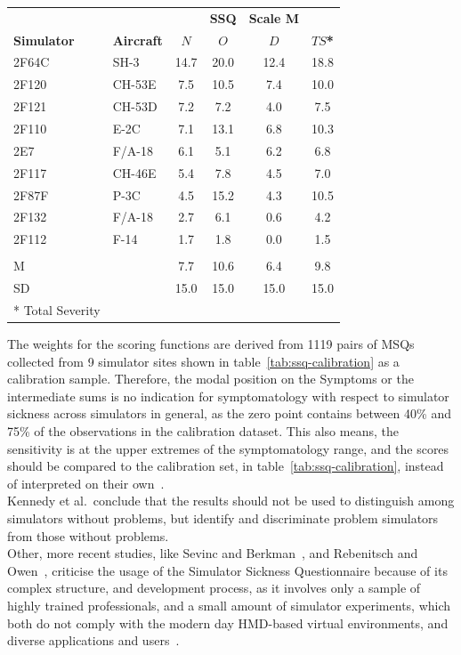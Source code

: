 \begin{center}
    \begin{tabular}{ l l c c c c}
        \toprule
         & & & \textbf{SSQ} & \textbf{Scale M} & \\
        \textbf{Simulator} & \textbf{Aircraft} & \textbf{$N$} & \textbf{$O$} & \textbf{$D$} & \textbf{$TS$*} \\
        \midrule
        2F64C & SH-3   & 14.7 & 20.0 & 12.4 & 18.8 \\
        2F120 & CH-53E & 7.5  & 10.5 & 7.4  & 10.0 \\
        2F121 & CH-53D & 7.2  & 7.2  & 4.0  & 7.5  \\
        2F110 & E-2C   & 7.1  & 13.1 & 6.8  & 10.3 \\
        2E7   & F/A-18 & 6.1  & 5.1  & 6.2  & 6.8  \\
        2F117 & CH-46E & 5.4  & 7.8  & 4.5  & 7.0  \\
        2F87F & P-3C   & 4.5  & 15.2 & 4.3  & 10.5 \\
        2F132 & F/A-18 & 2.7  & 6.1  & 0.6  & 4.2  \\
        2F112 & F-14   & 1.7  & 1.8  & 0.0  & 1.5  \\
              &        &      &      &      &      \\
        M     &        & 7.7  & 10.6 & 6.4  & 9.8  \\
        SD    &        & 15.0 & 15.0 & 15.0 & 15.0 \\
        \bottomrule
        * Total Severity & & & & & \\
    \end{tabular}
    \label{tab:ssq-calibration}
\end{center}
The weights for the scoring functions are derived from 1119 pairs of MSQs collected from 9 simulator sites
shown in table~\ref{tab:ssq-calibration} as a calibration sample.
Therefore, the modal position on the Symptoms or the intermediate sums is no indication for symptomatology with
respect to simulator sickness across simulators in general, as the zero point contains between 40\% and 75\% of the
observations in the calibration dataset.
This also means, the sensitivity is at the upper extremes of the symptomatology range, and the scores should be
compared to the calibration set, in table~\ref{tab:ssq-calibration}, instead of
interpreted on their own~\cite{Kennedy1993}.
\\
Kennedy et al.\ conclude that the results should not be used to distinguish among simulators without problems, but
identify and discriminate problem simulators from those without problems.
\\
Other, more recent studies, like Sevinc and Berkman~\cite{Sevinc2020}, and Rebenitsch and Owen~\cite{Rebenitsch2016},
criticise the usage of the Simulator Sickness Questionnaire because of its complex structure, and development
process, as it involves only a sample of highly trained professionals, and a small amount of simulator experiments,
which both do not comply with the modern day HMD-based virtual environments, and diverse applications
and users~\cite{Sevinc2020}.

